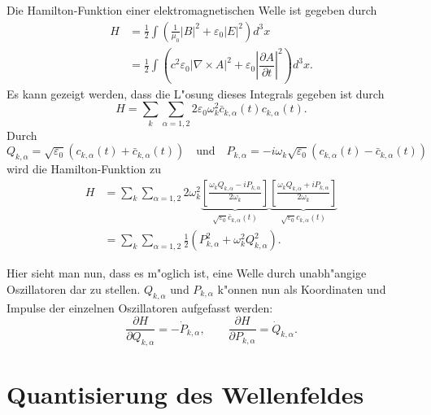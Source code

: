 Die Hamilton-Funktion einer elektromagnetischen Welle ist gegeben durch
\begin{equation*}
\begin{split}
H &= \frac{1}{2} \int \left(\frac{1}{\mu_0}|B|^2 + \varepsilon_0|E|^2\right) d^3 x \\
	&= \frac{1}{2} \int \left(c^2 \varepsilon_0 | \nabla\times A |^2 + \varepsilon_0 \left| \dfrac{\partial A}{\partial t} \right|^2 \right) d^3 x.
\end{split}
\end{equation*}
Es kann gezeigt werden, dass die L"osung dieses Integrals gegeben ist durch
\begin{equation*}
H = \sum_k \sum_{\alpha=1,2} 2 \varepsilon_0 \omega_k^2 \bar{c}_{k,\alpha}(t) c_{k,\alpha}(t).
\end{equation*}
Durch 
\begin{equation*}
Q_{k,\alpha} = \sqrt{\varepsilon_0} \left(c_{k,\alpha}(t) + \bar{c}_{k,\alpha}(t)\right) \quad \text{und} \quad P_{k,\alpha} = -i \omega_k \sqrt{\varepsilon_0} \left(c_{k,\alpha}(t) - \bar{c}_{k,\alpha}(t)\right)
\end{equation*}
wird die Hamilton-Funktion zu
\begin{equation} \label{fq:hamilton}
\begin{split}
H &= \sum_k \sum_{\alpha=1,2} 2 \omega_k^2 
	\underbrace{\left[ \frac{\omega_k Q_{k,\alpha} - i P_{k,\alpha}}{2 \omega_k} \right]}_{\sqrt{\varepsilon_0} \bar{c}_{k,\alpha}(t)}
	\underbrace{\left[ \frac{\omega_k Q_{k,\alpha} + i P_{k,\alpha}}{2 \omega_k} \right]}_{\sqrt{\varepsilon_0} c_{k,\alpha}(t)} \\
&= \sum_k \sum_{\alpha=1,2} \frac{1}{2} \left(P_{k,\alpha}^2 + \omega_k^2 Q_{k,\alpha}^2\right).
\end{split}
\end{equation}

Hier sieht man nun, dass es m"oglich ist, eine Welle durch unabh"angige Oszillatoren dar zu stellen.
$Q_{k,\alpha}$ und $P_{k,\alpha}$ k"onnen nun als Koordinaten und Impulse der einzelnen Oszillatoren aufgefasst werden:
\begin{equation*}
\dfrac{\partial H}{\partial Q_{k,\alpha}} = -\dot{P}_{k,\alpha}, \qquad \dfrac{\partial H}{\partial P_{k,\alpha}} = \dot{Q}_{k,\alpha}.
\end{equation*}

\section{Quantisierung des Wellenfeldes}

